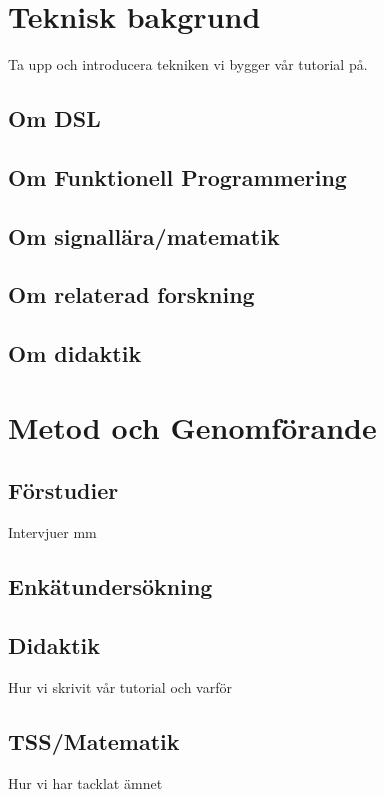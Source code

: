 \documentclass{article}
\begin{document}
\section{Teknisk bakgrund}
Ta upp och introducera tekniken vi bygger vår tutorial på. 

\subsection{Om DSL}

\subsection{Om Funktionell Programmering}

\subsection{Om signallära/matematik}

\subsection{Om relaterad forskning}

\subsection{Om didaktik}


\section{Metod och Genomförande}

\subsection{Förstudier}
Intervjuer mm

\subsection{Enkätundersökning}

\subsection{Didaktik}
Hur vi skrivit vår tutorial och varför 

\subsection{TSS/Matematik}
Hur vi har tacklat ämnet
\end{document}
